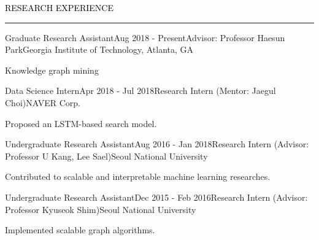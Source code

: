 \documentclass{resume} %
\renewenvironment{rSection}[1]{
	\sectionskip
	\textcolor{Black}{\MakeUppercase{#1}}
	\sectionlineskip
	\hrule
	\begin{list}{}{
			\setlength{\leftmargin}{1.5em}
		}
		\item[]
	}{
	\end{list}
}
\begin{document}
\vspace*{-1.0mm}
\begin{rSection}{Research Experience}
\begin{rSubsection}{Graduate Research Assistant}{Aug 2018 - Present}{Advisor: Professor Haesun Park}{Georgia Institute of Technology, Atlanta, GA}
	\item Knowledge graph mining
\end{rSubsection}	
\vspace*{-2.5mm}
\begin{rSubsection}{Data Science Intern}{Apr 2018 - Jul 2018}{Research Intern (Mentor: Jaegul Choi)}{NAVER Corp.}
	\item Proposed an LSTM-based search model.
\end{rSubsection}	
\vspace*{-2.5mm}
\begin{rSubsection}{Undergraduate Research Assistant}{Aug 2016 - Jan 2018}{Research Intern (Advisor: Professor U Kang, Lee Sael)}{Seoul National University}
	\item Contributed to scalable and interpretable machine learning researches.
\end{rSubsection}	
\vspace*{-2.5mm}
\begin{rSubsection}{Undergraduate Research Assistant}{Dec 2015 - Feb 2016}{Research Intern (Advisor: Professor Kyuseok Shim)}{Seoul National University}
	\item Implemented scalable graph algorithms.
\end{rSubsection}

\end{rSection}



%	
\end{document}
